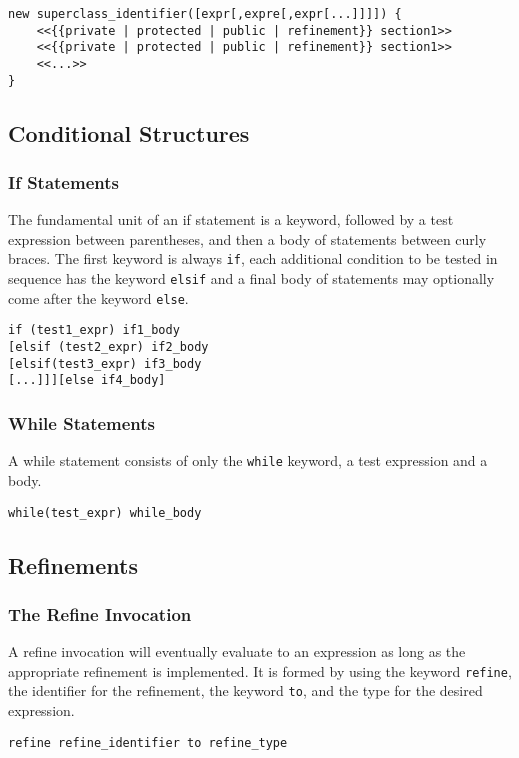 \begin{lstlisting}
new superclass_identifier([expr[,expre[,expr[...]]]]) {
    <<{{private | protected | public | refinement}} section1>>
    <<{{private | protected | public | refinement}} section1>>
    <<...>>
}
\end{lstlisting}

\subsection{Conditional Structures}
\subsubsection{If Statements}
The fundamental unit of an if statement is a keyword, followed by a test expression between parentheses, and then a body of statements between curly braces. The first keyword is always \verb!if!, each additional condition to be tested in sequence has the keyword \verb!elsif! and a final body of statements may optionally come after the keyword \verb!else!.

\begin{lstlisting}
if (test1_expr) if1_body
[elsif (test2_expr) if2_body
[elsif(test3_expr) if3_body
[...]]][else if4_body]
\end{lstlisting}

\subsubsection{While Statements}
A while statement consists of only the \verb!while! keyword, a test expression and a body.

\begin{lstlisting}
while(test_expr) while_body
\end{lstlisting}

\subsection{Refinements}
\subsubsection{The Refine Invocation}
A refine invocation will eventually evaluate to an expression as long as the appropriate refinement is implemented. It is formed by using the keyword \verb!refine!, the identifier for the refinement, the keyword \verb!to!, and the type for the desired expression.

\begin{lstlisting}
refine refine_identifier to refine_type
\end{lstlisting}

